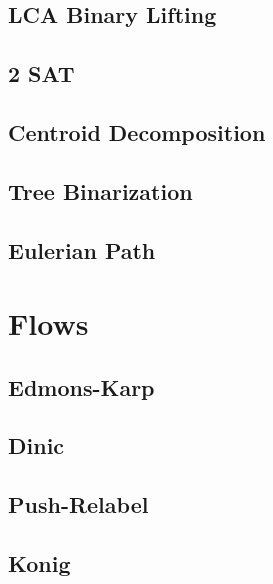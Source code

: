 \subsection{LCA Binary Lifting}
\raggedbottom
\hrulefill
\subsection{2 SAT}
\raggedbottom
\hrulefill
\subsection{Centroid Decomposition}
\raggedbottom
\hrulefill
\subsection{Tree Binarization}
\raggedbottom
\hrulefill
\subsection{Eulerian Path}
\raggedbottom
\hrulefill

\section{Flows}
\subsection{Edmons-Karp}
\raggedbottom
\hrulefill
\subsection{Dinic}
\raggedbottom
\hrulefill
\subsection{Push-Relabel}
\raggedbottom
\hrulefill
\subsection{Konig}
\raggedbottom
\hrulefill
